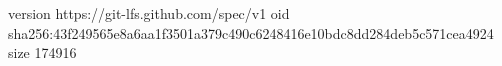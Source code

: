 version https://git-lfs.github.com/spec/v1
oid sha256:43f249565e8a6aa1f3501a379c490c6248416e10bdc8dd284deb5c571cea4924
size 174916
